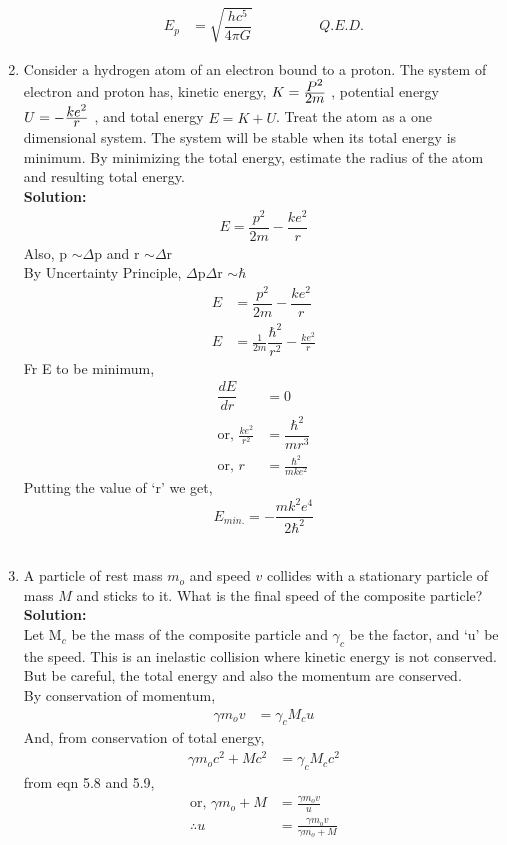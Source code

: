 \begin{enumerate}
\begin{align*}
    E_p &= \sqrt{\dfrac{hc^5}{4\pi G}}\hspace{2cm}Q.E.D.
\end{align*}
\item Consider a hydrogen atom of an electron bound to a proton. The system of electron and proton has, kinetic energy, $K = \frac{\displaystyle P^2}{\displaystyle 2m}$ , potential energy $U = -\frac{\displaystyle ke^2}{\displaystyle r}$ , and total energy $E = K + U$. Treat the atom as a one dimensional system. The system will be stable when its total energy is minimum. By minimizing the total energy, estimate the radius of the atom and resulting total energy. \\
\textbf{Solution:}\\
\begin{align*}
    E = \dfrac{p^2}{2m} - \dfrac{ke^2}{r}
\end{align*}
Also, p $\sim \Delta$p and r $\sim \Delta$r\\
By Uncertainty Principle, $\Delta$p$\Delta$r $\sim \hbar$
\begin{align*}
    E &= \dfrac{p^2}{2m} - \dfrac{ke^2}{r}\\
    E &=  \frac{1}{2m}\dfrac{\hbar^2}{r^2}  - \frac{ke^2}{r}
\end{align*}
Fr E to be minimum, 
\begin{align*}
    \dfrac{dE}{dr} &= 0\\
    \text{or, } \frac{ke^2}{r^2}   &= \dfrac{\hbar^2}{m r^3}\\
    \text{or, }r   &=   \frac{\hbar^2}{mke^2}
\end{align*}
Putting the value of ‘r’ we get,  \\
\[E_{min.}  =  -\dfrac{mk^2e^4}{2\hbar^2} \]
\\
\item A particle of rest mass $m_o$ and speed $v$ collides with a stationary particle of mass $M$ and sticks to it. What is the ﬁnal speed of the composite particle?\\

\textbf{Solution:}\\

Let M$_c$ be the mass of the composite particle and $\gamma_c$ be the factor, and ‘u’ be the speed. This is an inelastic collision where kinetic energy is not conserved. But be careful, the total energy and also the momentum are conserved.\\
By conservation of momentum, \\
\begin{align}
    \gamma m_o v  &= \gamma_c M_c u   
\end{align}
And, from conservation of total energy,
\begin{align}
    \gamma m_o c^2  +  Mc^2  &=  \gamma_c M_c c^2
\end{align}
from eqn 5.8 and 5.9, 
\begin{align*}
    \text{or, }\gamma m_o   +  M  &=  \frac{\gamma m_o v}{u}\\
    \therefore u &=  \frac{\gamma m_ov}{\gamma m_o + M}
\end{align*}
\end{enumerate}

